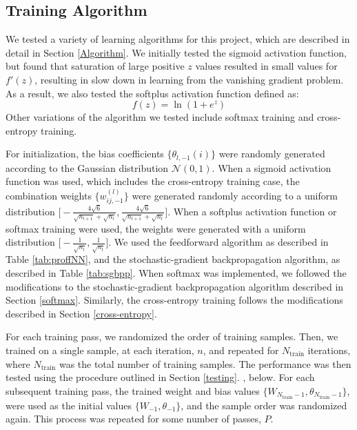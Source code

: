 \documentclass[journal,a4paper,onecolumn,11pt]{IEEEtran}
\begin{document}
\subsection{Training Algorithm} \label{training}
We tested a variety of learning algorithms for this project, which are described in detail in Section \ref{Algorithm}. We initially tested the sigmoid activation function, but found that saturation of large positive $z$ values resulted in small values for $f'(z)$, resulting in slow down in learning from the vanishing gradient problem. As a result, we also tested the softplus activation function defined as:
\begin{equation}
f(z)=\ln(1+e^z)
\end{equation}
Other variations of the algorithm we tested include softmax training and cross-entropy training.

For initialization, the bias coefficients $\{\theta_{l,-1}(i)\}$ were randomly generated according to the Gaussian distribution $\mathcal{N}(0,1)$. When a sigmoid activation function was used, which includes the cross-entropy training case, the combination weights $\{w_{ij,-1}^{(l)}\}$ were generated randomly according to a uniform distribution $\big[-\frac{4\sqrt{6}}{\sqrt{n_{l+1}}+\sqrt{n_l}}, \frac{4\sqrt{6}}{\sqrt{n_{l+1}}+\sqrt{n_l}}\big]$. When a softplus activation function or softmax training were used, the weights were generated with a uniform distribution  $\big[-\frac{1}{\sqrt{n_l}}, \frac{1}{\sqrt{n_l}}\big]$. We used the feedforward algorithm as described in Table \ref{tab:proffNN}, and the stochastic-gradient backpropagation algorithm, as described in Table \ref{tab:sgbpp}. When softmax was implemented, we followed the modifications to the stochastic-gradient backpropagation algorithm described in Section \ref{softmax}. Similarly, the cross-entropy training follows the modifications described in Section \ref{cross-entropy}.

For each training pass, we randomized the order of training samples. Then, we trained on a single sample, at each iteration, $n$, and repeated for $N_\text{train}$ iterations, where $N_\text{train}$ was the total number of training samples. The performance was then tested using the procedure outlined in Section \ref{testing}. , below. For each subsequent training pass, the trained weight and bias values $\{W_{N_\text{train}-1},\theta_{N_\text{train}-1}\}$, were used as the initial values $\{W_{-1},\theta_{-1}\}$, and the sample order was randomized again. This process was repeated for some number of passes, $P$.
\end{document}
